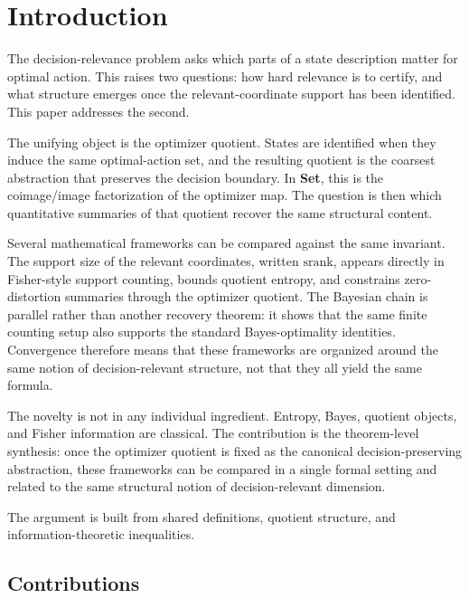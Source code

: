 \section{Introduction}\label{sec:introduction}

The decision-relevance problem asks which parts of a state description matter for optimal action. This raises two questions: how hard relevance is to certify, and what structure emerges once the relevant-coordinate support has been identified. This paper addresses the second.

The unifying object is the optimizer quotient. States are identified when they induce the same optimal-action set, and the resulting quotient is the coarsest abstraction that preserves the decision boundary. In \textbf{Set}, this is the coimage/image factorization of the optimizer map. The question is then which quantitative summaries of that quotient recover the same structural content.

Several mathematical frameworks can be compared against the same invariant. The support size of the relevant coordinates, written $\mathrm{srank}$, appears directly in Fisher-style support counting, bounds quotient entropy, and constrains zero-distortion summaries through the optimizer quotient. The Bayesian chain is parallel rather than another recovery theorem: it shows that the same finite counting setup also supports the standard Bayes-optimality identities. Convergence therefore means that these frameworks are organized around the same notion of decision-relevant structure, not that they all yield the same formula.

The novelty is not in any individual ingredient. Entropy, Bayes, quotient objects, and Fisher information are classical. The contribution is the theorem-level synthesis: once the optimizer quotient is fixed as the canonical decision-preserving abstraction, these frameworks can be compared in a single formal setting and related to the same structural notion of decision-relevant dimension.

The argument is built from shared definitions, quotient structure, and information-theoretic inequalities.

\subsection{Contributions}

